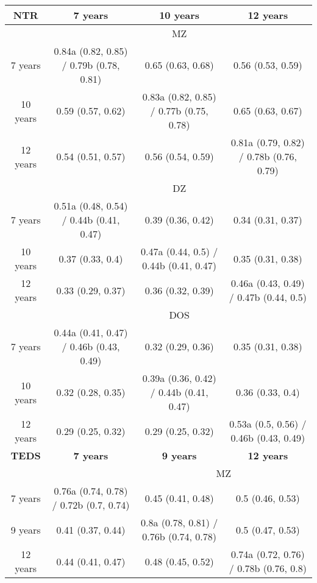 \begin{tabular}{ccccc}
  \toprule
  \textbf{NTR} & \multicolumn{2}{c}{\textbf{7 years}} & \textbf{10 years} & \textbf{12 years} \\
  \midrule
  & \multicolumn{4}{c}{MZ} \\
  7 years & \multicolumn{2}{c}{0.84a (0.82, 0.85) / 0.79b (0.78, 0.81)} & 0.65 (0.63, 0.68) & 0.56 (0.53, 0.59) \\
  10 years & \multicolumn{2}{c}{0.59 (0.57, 0.62)} & 0.83a (0.82, 0.85) / 0.77b (0.75, 0.78) & 0.65 (0.63, 0.67) \\
  12 years & \multicolumn{2}{c}{0.54 (0.51, 0.57)} & 0.56 (0.54, 0.59) & 0.81a (0.79, 0.82) / 0.78b (0.76, 0.79) \\
  \cmidrule{1-5}          & \multicolumn{4}{c}{DZ} \\
  7 years & \multicolumn{2}{c}{0.51a (0.48, 0.54) / 0.44b (0.41, 0.47)} & 0.39 (0.36, 0.42) & 0.34 (0.31, 0.37) \\
  10 years & \multicolumn{2}{c}{0.37 (0.33, 0.4)} & 0.47a (0.44, 0.5) / 0.44b (0.41, 0.47) & 0.35 (0.31, 0.38) \\
  12 years & \multicolumn{2}{c}{0.33 (0.29, 0.37)} & 0.36 (0.32, 0.39) & 0.46a (0.43, 0.49) / 0.47b (0.44, 0.5) \\
  \cmidrule{1-5}          & \multicolumn{4}{c}{DOS} \\
  7 years & \multicolumn{2}{c}{0.44a (0.41, 0.47) / 0.46b (0.43, 0.49)} & 0.32 (0.29, 0.36) & 0.35 (0.31, 0.38) \\
  10 years & \multicolumn{2}{c}{0.32 (0.28, 0.35)} & 0.39a (0.36, 0.42) / 0.44b (0.41, 0.47) & 0.36 (0.33, 0.4) \\
  12 years & \multicolumn{2}{c}{0.29 (0.25, 0.32)} & 0.29 (0.25, 0.32) & 0.53a (0.5, 0.56) / 0.46b (0.43, 0.49) \\
  \midrule
  \textbf{TEDS} & \multicolumn{2}{c}{\textbf{7 years}} & \textbf{9 years} & \textbf{12 years} \\
  \midrule
  &       & \multicolumn{3}{c}{MZ} \\
  7 years & \multicolumn{2}{c}{0.76a (0.74, 0.78) / 0.72b (0.7, 0.74)} & 0.45 (0.41, 0.48) & 0.5 (0.46, 0.53) \\
  9 years & \multicolumn{2}{c}{0.41 (0.37, 0.44)} & 0.8a (0.78, 0.81) / 0.76b (0.74, 0.78) & 0.5 (0.47, 0.53) \\
  12 years & \multicolumn{2}{c}{0.44 (0.41, 0.47)} & 0.48 (0.45, 0.52) & 0.74a (0.72, 0.76) / 0.78b (0.76, 0.8) \\

\end{tabular}
